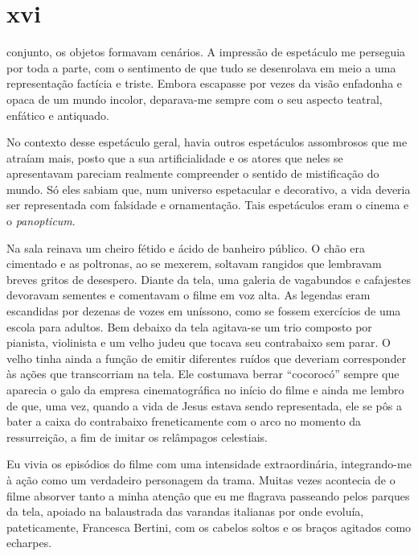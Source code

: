 \section{xvi} 

 conjunto, os objetos formavam cenários. A impressão de espetáculo
 me perseguia por toda a parte, com o sentimento de que tudo se desenrolava
 em meio a uma representação factícia e triste. Embora escapasse por vezes da
 visão enfadonha e opaca de um mundo incolor, deparava-me sempre com o seu
 aspecto teatral, enfático e antiquado.

No contexto desse espetáculo geral, havia outros espetáculos assombrosos que
me atraíam mais, posto que a sua artificialidade e os atores que neles se
apresentavam pareciam realmente compreender o sentido de mistificação do
mundo. Só eles sabiam que, num universo espetacular e decorativo, a vida
deveria ser representada com falsidade e ornamentação. Tais espetáculos eram
o cinema e o \textit{panopticum}. 


Na sala reinava um cheiro fétido e ácido de banheiro público. O chão era
cimentado e as poltronas, ao se mexerem, soltavam rangidos que lembravam
breves gritos de desespero. Diante da tela, uma galeria de vagabundos e
cafajestes devoravam sementes e comentavam o filme em voz alta. As legendas
eram escandidas por dezenas de vozes em uníssono, como se fossem exercícios
de uma escola para adultos. Bem debaixo da tela agitava-se um trio composto
por pianista, violinista e um velho judeu que tocava seu contrabaixo sem
parar. O velho tinha ainda a função de emitir diferentes ruídos que deveriam
corresponder às ações que transcorriam na tela. Ele costumava berrar
``cocorocó'' sempre que aparecia o galo da empresa cinematográfica no início
do filme e ainda me lembro de que, uma vez, quando a vida de Jesus estava
sendo representada, ele se pôs a bater a caixa do contrabaixo freneticamente
com o arco no momento da ressurreição, a fim de imitar os relâmpagos
celestiais.

Eu vivia os episódios do filme com uma intensidade extraordinária,
integrando-me à ação como um verdadeiro personagem da trama. Muitas vezes
acontecia de o filme absorver tanto a minha atenção que eu me flagrava
passeando pelos parques da tela, apoiado na balaustrada das varandas
italianas por onde evoluía, pateticamente, Francesca Bertini,  com os cabelos
soltos e os braços agitados como echarpes.


